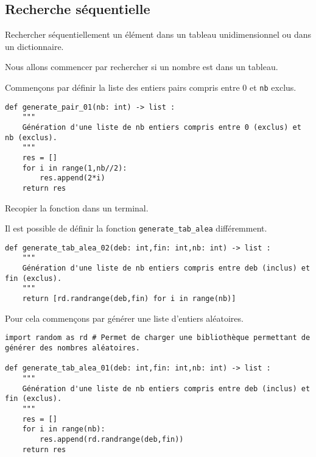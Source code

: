 %
\subsection*{Recherche séquentielle}


\begin{obj}
Rechercher séquentiellement un élément dans un tableau unidimensionnel ou dans un dictionnaire.
\end{obj}

Nous allons commencer par rechercher si un nombre est dans un tableau. 

Commençons par définir la liste des entiers pairs compris entre 0 et \texttt{nb} exclus.

\begin{lstlisting}
def generate_pair_01(nb: int) -> list :
    """
	Génération d'une liste de nb entiers compris entre 0 (exclus) et nb (exclus).
    """
    res = []
    for i in range(1,nb//2):
        res.append(2*i)
    return res
\end{lstlisting}

Recopier la fonction dans un terminal.





Il est possible de définir la fonction \texttt{generate\_tab\_alea} différemment.
\begin{lstlisting}
def generate_tab_alea_02(deb: int,fin: int,nb: int) -> list :
    """
	Génération d'une liste de nb entiers compris entre deb (inclus) et fin (exclus).
    """
    return [rd.randrange(deb,fin) for i in range(nb)]

\end{lstlisting}



Pour cela commençons par générer une liste d'entiers aléatoires.




\begin{lstlisting}
import random as rd # Permet de charger une bibliothèque permettant de générer des nombres aléatoires.

def generate_tab_alea_01(deb: int,fin: int,nb: int) -> list :
    """
	Génération d'une liste de nb entiers compris entre deb (inclus) et fin (exclus).
    """
    res = []
    for i in range(nb):
        res.append(rd.randrange(deb,fin))
    return res
\end{lstlisting}


